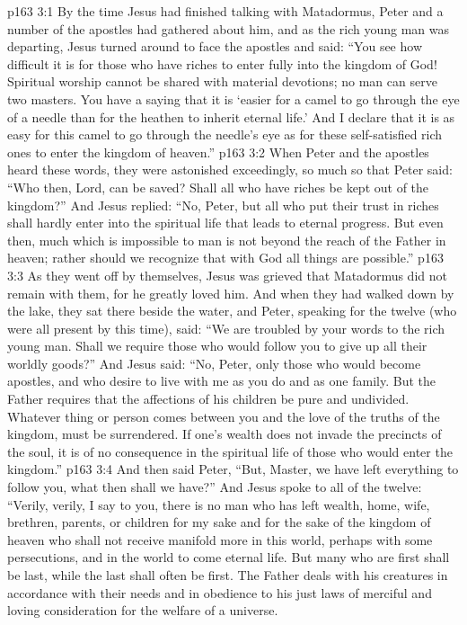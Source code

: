 \vs p163 3:1 By the time Jesus had finished talking with Matadormus, Peter and a number of the apostles had gathered about him, and as the rich young man was departing, Jesus turned around to face the apostles and said: \textcolor{ubdarkred}{“You see how difficult it is for those who have riches to enter fully into the kingdom of God! Spiritual worship cannot be shared with material devotions; no man can serve two masters. You have a saying that it is ‘easier for a camel to go through the eye of a needle than for the heathen to inherit eternal life.’ And I declare that it is as easy for this camel to go through the needle’s eye as for these self\hyp{}satisfied rich ones to enter the kingdom of heaven.”}
\vs p163 3:2 When Peter and the apostles heard these words, they were astonished exceedingly, so much so that Peter said: “Who then, Lord, can be saved? Shall all who have riches be kept out of the kingdom?” And Jesus replied: \textcolor{ubdarkred}{“No, Peter, but all who put their trust in riches shall hardly enter into the spiritual life that leads to eternal progress. But even then, much which is impossible to man is not beyond the reach of the Father in heaven; rather should we recognize that with God all things are possible.”}
\vs p163 3:3 As they went off by themselves, Jesus was grieved that Matadormus did not remain with them, for he greatly loved him. And when they had walked down by the lake, they sat there beside the water, and Peter, speaking for the twelve (who were all present by this time), said: “We are troubled by your words to the rich young man. Shall we require those who would follow you to give up all their worldly goods?” And Jesus said: \textcolor{ubdarkred}{“No, Peter, only those who would become apostles, and who desire to live with me as you do and as one family. But the Father requires that the affections of his children be pure and undivided. Whatever thing or person comes between you and the love of the truths of the kingdom, must be surrendered. If one’s wealth does not invade the precincts of the soul, it is of no consequence in the spiritual life of those who would enter the kingdom.”}
\vs p163 3:4 And then said Peter, “But, Master, we have left everything to follow you, what then shall we have?” And Jesus spoke to all of the twelve: \textcolor{ubdarkred}{“Verily, verily, I say to you, there is no man who has left wealth, home, wife, brethren, parents, or children for my sake and for the sake of the kingdom of heaven who shall not receive manifold more in this world, perhaps with some persecutions, and in the world to come eternal life. But many who are first shall be last, while the last shall often be first. The Father deals with his creatures in accordance with their needs and in obedience to his just laws of merciful and loving consideration for the welfare of a universe.}
